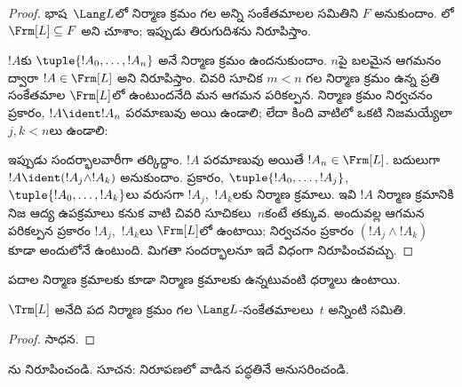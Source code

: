 \documentclass[../../../include/open-logic-section]{subfiles}
\begin{document}
\begin{proof}
భాష~$\Lang L$లో నిర్మాణ క్రమం గల అన్ని సంకేతమాలల సమితిని $F$
అనుకుందాం. లో
$\Frm[L] \subseteq F$ అని చూశాం; ఇప్పుడు తిరుగుదిశను నిరూపిస్తాం.

$!A$కు $\tuple{!A_0,\dotsc,!A_n}$ అనే నిర్మాణ క్రమం ఉందనుకుందాం.
$n$పై బలమైన ఆగమనం ద్వారా $!A \in \Frm[L]$ అని నిరూపిస్తాం. చివరి
సూచిక $m < n$ గల నిర్మాణ క్రమం ఉన్న ప్రతి సంకేతమాల $\Frm[L]$లో
ఉంటుందనేది మన ఆగమన పరికల్పన.
నిర్మాణ క్రమం నిర్వచనం ప్రకారం, $!A \ident !A_n$ పరమాణువు అయి ఉండాలి;
లేదా కింది వాటిలో ఒకటి నిజమయ్యేలా $j,k < n$లు ఉండాలి:
\begin{enumerate}
\end{enumerate}
ఇప్పుడు సందర్భాలవారీగా తర్కిద్దాం. $!A$ పరమాణువు అయితే
$!A_n \in \Frm[L]$.
బదులుగా $!A \ident (!A_j \land !A_k)$ అనుకుందాం.
 ప్రకారం,
$\tuple{!A_0,\dotsc,!A_j}$, $\tuple{!A_0,\dotsc,!A_k}$లు వరుసగా
$!A_j$,~$!A_k$లకు నిర్మాణ క్రమాలు. ఇవి $!A$ నిర్మాణ క్రమానికి నిజ
ఆద్య ఉపక్రమాలు కనుక వాటి చివరి సూచికలు~$n$కంటే తక్కువ. అందువల్ల
ఆగమన పరికల్పన ప్రకారం $!A_j$,~$!A_k$లు $\Frm[L]$లో ఉంటాయి; 
నిర్వచనం ప్రకారం $(!A_j \land !A_k)$ కూడా అందులోనే ఉంటుంది. మిగతా
సందర్భాలనూ ఇదే విధంగా నిరూపించవచ్చు.
\end{proof}

పదాల నిర్మాణ క్రమాలకు కూడా  నిర్మాణ క్రమాలకు ఉన్నటువంటి ధర్మాలు
ఉంటాయి.

\begin{prop}
$\Trm[L]$ అనేది పద నిర్మాణ క్రమం గల $\Lang L$-సంకేతమాలలు~$t$
అన్నింటి సమితి.
\end{prop}

\begin{proof}
సాధన.
\end{proof}

\begin{prob}
ను నిరూపించండి.
సూచన:  నిరూపణలో వాడిన
పద్ధతినే అనుసరించండి.
\end{prob}
\end{document}
